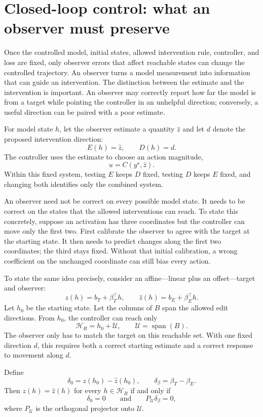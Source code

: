 \section{Closed-loop control: what an observer must preserve}
\label{sec:design}

Once the controlled model, initial states, allowed intervention rule,
controller, and loss are fixed, only observer errors that affect reachable
states can change the controlled trajectory. An observer turns a model
measurement into information that can guide an intervention. The distinction
between the estimate and the intervention is important. An observer may
correctly report how far the model is from a target while pointing the
controller in an unhelpful direction; conversely, a useful direction can be
paired with a poor estimate.

For model state $h$, let the observer estimate a quantity $\widehat z$ and let
$d$ denote the proposed intervention direction:
\[
E(h)=\widehat z,
\qquad
D(h)=d.
\]
The controller uses the estimate to choose an action magnitude,
\[
u=C(y^\star,\widehat z).
\]
Within this fixed system, testing $E$ keeps $D$ fixed, testing $D$ keeps $E$
fixed, and changing both identifies only the combined system.

An observer need not be correct on every possible model state. It needs to be
correct on the states that the allowed interventions can reach. To state this
concretely, suppose an activation has three coordinates but the controller can
move only the first two. First calibrate the observer to agree with the target
at the starting state. It then needs to predict changes along the first two
coordinates; the third stays fixed. Without that initial calibration, a wrong
coefficient on the unchanged coordinate can still bias every action.

To state the same idea precisely, consider an affine---linear plus an
offset---target and observer:
\[
z(h)=b_T+\beta_T^\top h,
\qquad
\widehat z(h)=b_E+\beta_E^\top h.
\]
Let $h_0$ be the starting state. Let the columns of $B$ span the allowed edit
directions. From $h_0$, the controller can reach only
\[
\mathcal H_R=h_0+\mathcal U,
\qquad
\mathcal U=\operatorname{span}(B).
\]
The observer only has to match the target on this reachable set. With one fixed
direction $d$, this requires both a correct starting estimate and a correct
response to movement along $d$.

\begin{proposition}
\label{prop:reachable}
Define
\[
\delta_0=z(h_0)-\widehat z(h_0),
\qquad
\delta_\beta=\beta_T-\beta_E.
\]
Then $z(h)=\widehat z(h)$ for every $h\in\mathcal H_R$ if and only if
\[
\delta_0=0
\qquad\text{and}\qquad
P_{\mathcal U}\delta_\beta=0,
\]
where $P_{\mathcal U}$ is the orthogonal projector onto $\mathcal U$.
\end{proposition}

